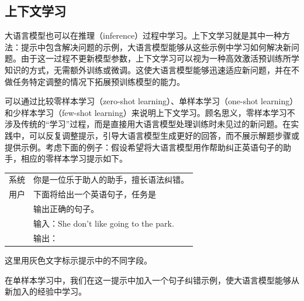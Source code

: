 \subsection{上下文学习}

\noindent 大语言模型也可以在推理（inference）过程中学习。上下文学习就是其中一种方法：提示中包含解决问题的示例，大语言模型能够从这些示例中学习如何解决新问题。由于这一过程不更新模型参数，上下文学习可以视为一种高效激活预训练所学知识的方式，无需额外训练或微调。这使大语言模型能够迅速适应新问题，并在不做任务特定调整的情况下拓展预训练模型的能力。

可以通过比较零样本学习（zero-shot learning）、单样本学习（one-shot learning）和少样本学习（few-shot learning）来说明上下文学习。顾名思义，零样本学习不涉及传统的“学习”过程，而是直接用大语言模型处理训练时未见过的新问题。在实践中，可以反复调整提示，引导大语言模型生成更好的回答，而不展示解题步骤或提供示例。考虑下面的例子：假设希望将大语言模型用作帮助纠正英语句子的助手，相应的零样本学习提示如下。

\vspace{0.5em}
\begin{tcolorbox}

\begingroup
\renewcommand{\arraystretch}{1.0}
\setlength{\tabcolsep}{6pt}
\begin{tabular}{r l}
{\color{gray} \footnotesize{系统}} & 你是一位乐于助人的助手，擅长语法纠错。 \\ [0.2cm]
{\color{gray} \footnotesize{用户}}  & 下面将给出一个英语句子，任务是 \\
 & 输出正确的句子。 \\ [0.1cm]
 & 输入：She don't like going to the park. \\
 & 输出：\underline{\hspace{2em}}
\end{tabular}
\endgroup

\end{tcolorbox}
\vspace{0.5em}

\noindent 这里用灰色文字标示提示中的不同字段。

在单样本学习中，我们在这一提示中加入一个句子纠错示例，使大语言模型能够从新加入的经验中学习。

